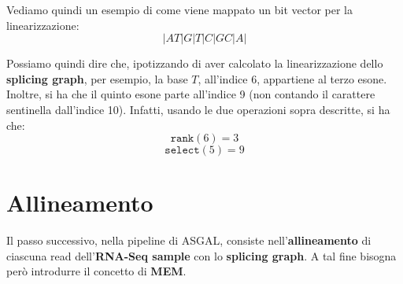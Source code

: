 \documentclass[a4paper,12pt, oneside]{book}
\begin{document}
\begin{esempio}
  Vediamo quindi un esempio di come viene mappato un bit vector per la
  linearizzazione:
  \[|AT|G|T|C|GC|A|\]
  \begin{center}
  \end{center}
  Possiamo quindi dire che, ipotizzando di aver calcolato la linearizzazione
  dello \textbf{splicing graph}, per esempio, la base $T$, all'indice 6,
  appartiene al terzo esone. Inoltre, si ha che il quinto esone parte all'indice
  9 (non contando il carattere sentinella dall'indice 10). Infatti, usando le
  due operazioni sopra descritte, si ha che:
  \[\mathtt{rank}(6)=3\]
  \[\mathtt{select}(5) =9\]
\end{esempio}

\section{Allineamento}
Il passo successivo, nella pipeline di ASGAL, consiste
nell'\textbf{allineamento} di ciascuna read dell'\textbf{RNA-Seq sample} con lo
\textbf{splicing graph}. A tal fine bisogna però introdurre il concetto di
\textbf{MEM}. 
\end{document}
